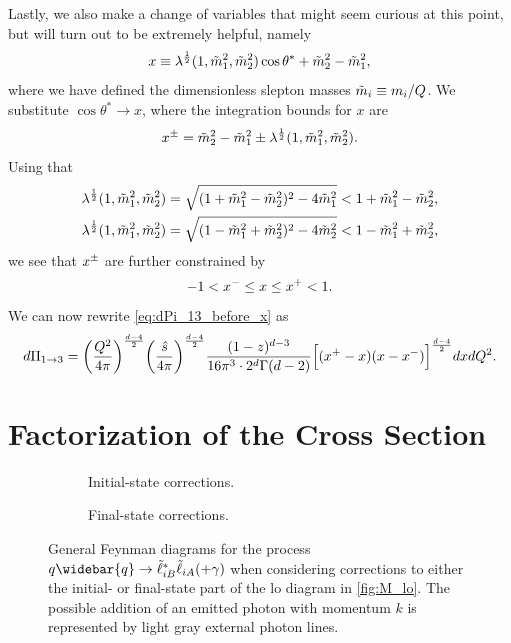 Lastly, we also make a change of variables that might seem curious at this point, but will turn out to be extremely helpful, namely
\begin{equation}
    x \equiv \lambda^\frac{1}{2}(1,\tilde{m}_1^2,\tilde{m}_2^2) \cos\theta^* + \tilde{m}_2^2 - \tilde{m}_1^2,
    \label{eq:x_def}
\end{equation}
where we have defined the dimensionless slepton masses $\tilde{m}_i \equiv m_i/Q$. We substitute $\cos\theta^* \to x$, where the integration bounds for $x$ are
\begin{equation}
    x^\pm = \tilde{m}_2^2 - \tilde{m}_1^2 \pm \lambda^\frac{1}{2}(1,\tilde{m}_1^2,\tilde{m}_2^2).
    \label{eq:xpm}
\end{equation}
Using that
\begin{subequations}
\begin{align}
    \lambda^{\frac{1}{2}}(1,\tilde{m}_1^2,\tilde{m}_2^2)
    &= \sqrt{(1+\tilde{m}_1^2-\tilde{m}_2^2)^2-4\tilde{m}_1^2}
    < 1+\tilde{m}_1^2-\tilde{m}_2^2,
    \\
    \lambda^{\frac{1}{2}}(1,\tilde{m}_1^2,\tilde{m}_2^2)
    &= \sqrt{(1-\tilde{m}_1^2+\tilde{m}_2^2)^2-4\tilde{m}_2^2}
    < 1-\tilde{m}_1^2+\tilde{m}_2^2,
\end{align}
\end{subequations}
we see that $x^\pm$ are further constrained by
\begin{equation}
    -1 < x^- \leq x \leq x^+ < 1.
    \label{eq:xpm_lim}
\end{equation}
We can now rewrite \cref{eq:dPi_13_before_x} as
\begin{equation}
    d\Pi_{1\to3} =
    \biggl(\frac{Q^2}{4\pi}\biggr)^{\frac{d-4}{2}}
    \biggl(\frac{\hat{s}}{4\pi}\biggr)^{\frac{d-4}{2}}
    \frac{(1-z)^{d-3}}{16\pi^3 \cdot 2^d \Gamma(d-2)}
    \Bigl[ (x^+-x)(x-x^-) \Bigr]^{\frac{d-4}{2}}
    dx dQ^2.
    \label{eq:dPi_13}
\end{equation}


\section{Factorization of the Cross Section}\label{sec:factorization}

\begin{figure}
    \centering
    \begin{subfigure}[b]{0.45\textwidth}
        \centering
        \caption{Initial-state corrections.}
        \label{fig:factor_left}
    \end{subfigure}
    \begin{subfigure}[b]{0.45\textwidth}
        \centering
        \caption{Final-state corrections.}
        \label{fig:factor_right}
    \end{subfigure}
    \caption{General Feynman diagrams for the process $q\widebar{q} \to \slepton_{iB}^*\slepton_{iA} (+\gamma)$ when considering corrections to either the initial- or final-state part of the \acrshort{lo} diagram in \cref{fig:M_lo}. The possible addition of an emitted photon with momentum $k$ is represented by light gray external photon lines.}
    \label{fig:M_factored}
\end{figure}

